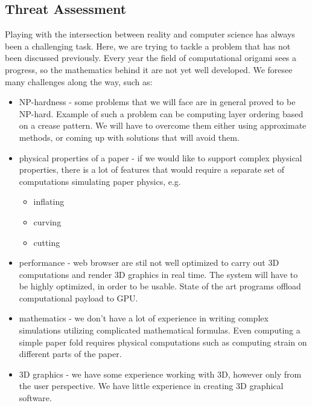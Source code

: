 \subsection{Threat Assessment}

Playing with the intersection between reality and computer science has always
been a challenging task.
Here, we are trying to tackle a problem that has not been discussed previously.
Every year the field of computational origami sees a progress,
so the mathematics behind it are not yet well developed.
We foresee many challenges along the way, such as:

\begin{itemize}
	\item NP-hardness - some problems that we will face are in general proved to be NP-hard.
		Example of such a problem can be computing layer ordering based on a crease pattern.
		We will have to overcome them either using approximate methods, or coming up with solutions that will avoid them.

	\item physical properties of a paper - if we would like to support complex physical properties,
		there is a lot of features that would require a separate set of computations simulating paper physics, e.g.
		\begin{itemize}
			\item inflating
			\item curving 
			\item cutting
		\end{itemize}

	\item performance - web browser are stil not well optimized to carry out 3D computations and render 3D graphics in real time.
		The system will have to be highly optimized, in order to be usable.
		State of the art programs offload computational payload to GPU.

	\item mathematics - we don't have a lot of experience in writing complex simulations utilizing complicated mathematical formulas.
		Even computing a simple paper fold requires physical computations such as computing strain on different parts of the paper.

	\item 3D graphics - we have some experience working with 3D, however only from the user perspective.
		We have little experience in creating 3D graphical software.

\end{itemize}

